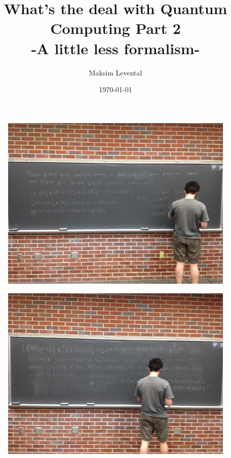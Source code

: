 \documentclass{beamer}
\title[What's the deal with QC]{What's the deal with Quantum Computing Part 2\\-A little less formalism-}
\author{Maksim Levental}
\date{\today}
\begin{document}

\begin{frame}
\titlepage
\end{frame}

\begin{frame}
  \begin{figure}[ht]
    \includegraphics[scale=.27]{pasted18}
  \end{figure}
\end{frame}
\begin{frame}
  \begin{figure}[ht]
    \includegraphics[scale=.27]{pasted17}
  \end{figure}
\end{frame}
\end{document}
